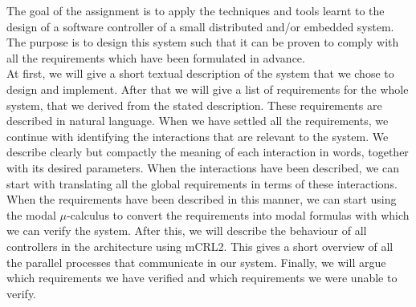 The goal of the assignment is to apply the techniques and tools learnt to the design of a software controller of a small distributed and/or embedded system. The purpose is to design this system such that it can be proven to comply with all the requirements which have been formulated in advance.\\

At first, we will give a short textual description of the system that we chose to design and implement. After that we will give a list of requirements for the whole system, that we derived from the stated description. These requirements are described in natural language. When we have settled all the requirements, we continue with identifying the interactions that are relevant to the system. We describe clearly but compactly the meaning of each interaction in words, together with its desired parameters. When the interactions have been described, we can start with translating all the global requirements in terms of these interactions. When the requirements have been described in this manner, we can start using the modal $\mu$-calculus to convert the requirements into modal formulas with which we can verify the system. After this, we will describe the behaviour of all controllers in the architecture using mCRL2\cite{url:mcrl}. This gives a short overview of all the parallel processes that communicate in our system. Finally, we will argue which requirements we have verified and which requirements we were unable to verify.